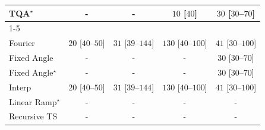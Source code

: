 \begin{tabular}{l|cccc|}
TQA$^\star$ & {\cellcolor[HTML]{000000}} \color[HTML]{F1F1F1} {\cellcolor{white}} \color{black} - & {\cellcolor[HTML]{000000}} \color[HTML]{F1F1F1} {\cellcolor{white}} \color{black} - & {\cellcolor[HTML]{F7FCF5}} \color[HTML]{000000} $10$ [$40$] & {\cellcolor[HTML]{F4FBF1}} \color[HTML]{000000} $30$ [$30$--$70$] \\
\cline{1-5}
\multicolumn{5}{c}{\rule{0pt}{8pt}PP} \\
\midrule
Fourier & {\cellcolor[HTML]{F5FBF3}} \color[HTML]{000000} $20$ [$40$--$50$] & {\cellcolor[HTML]{F4FBF1}} \color[HTML]{000000} $31$ [$39$--$144$] & {\cellcolor[HTML]{DFF3DA}} \color[HTML]{000000} $130$ [$40$--$100$] & {\cellcolor[HTML]{F1FAEE}} \color[HTML]{000000} $41$ [$30$--$100$] \\
Fixed Angle & {\cellcolor[HTML]{000000}} \color[HTML]{F1F1F1} {\cellcolor{white}} \color{black} - & {\cellcolor[HTML]{000000}} \color[HTML]{F1F1F1} {\cellcolor{white}} \color{black} - & {\cellcolor[HTML]{000000}} \color[HTML]{F1F1F1} {\cellcolor{white}} \color{black} - & {\cellcolor[HTML]{F4FBF1}} \color[HTML]{000000} $30$ [$30$--$70$] \\
Fixed Angle$^\star$ & {\cellcolor[HTML]{000000}} \color[HTML]{F1F1F1} {\cellcolor{white}} \color{black} - & {\cellcolor[HTML]{000000}} \color[HTML]{F1F1F1} {\cellcolor{white}} \color{black} - & {\cellcolor[HTML]{000000}} \color[HTML]{F1F1F1} {\cellcolor{white}} \color{black} - & {\cellcolor[HTML]{F4FBF1}} \color[HTML]{000000} $30$ [$30$--$70$] \\
Interp & {\cellcolor[HTML]{F5FBF3}} \color[HTML]{000000} $20$ [$40$--$50$] & {\cellcolor[HTML]{F4FBF1}} \color[HTML]{000000} $31$ [$39$--$144$] & {\cellcolor[HTML]{DFF3DA}} \color[HTML]{000000} $130$ [$40$--$100$] & {\cellcolor[HTML]{F1FAEE}} \color[HTML]{000000} $41$ [$30$--$100$] \\
Linear Ramp$^\star$ & {\cellcolor[HTML]{000000}} \color[HTML]{F1F1F1} {\cellcolor{white}} \color{black} - & {\cellcolor[HTML]{000000}} \color[HTML]{F1F1F1} {\cellcolor{white}} \color{black} - & {\cellcolor[HTML]{000000}} \color[HTML]{F1F1F1} {\cellcolor{white}} \color{black} - & {\cellcolor[HTML]{000000}} \color[HTML]{F1F1F1} {\cellcolor{white}} \color{black} - \\
Recursive TS & {\cellcolor[HTML]{000000}} \color[HTML]{F1F1F1} {\cellcolor{white}} \color{black} - & {\cellcolor[HTML]{000000}} \color[HTML]{F1F1F1} {\cellcolor{white}} \color{black} - & {\cellcolor[HTML]{000000}} \color[HTML]{F1F1F1} {\cellcolor{white}} \color{black} - & {\cellcolor[HTML]{000000}} \color[HTML]{F1F1F1} {\cellcolor{white}} \color{black} - \\

\end{tabular}
